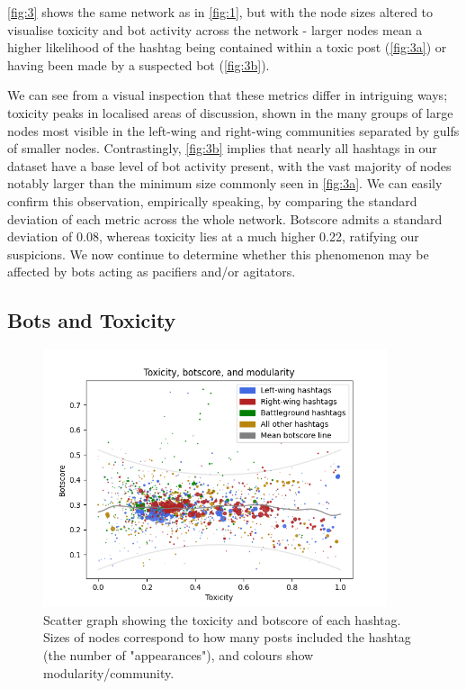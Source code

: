 \documentclass[a4paper,11pt]{article}  %
\begin{document}
	\autoref{fig:3} shows the same network as in \autoref{fig:1}, but with the node sizes altered to visualise toxicity and bot activity across the network - larger nodes mean a higher likelihood of the hashtag being contained within a toxic post (\autoref{fig:3a}) or having been made by a suspected bot (\autoref{fig:3b}). 
	
	We can see from a visual inspection that these metrics differ in intriguing ways; toxicity peaks in localised areas of discussion, shown in the many groups of large nodes most visible in the left-wing and right-wing communities separated by gulfs of smaller nodes. Contrastingly, \autoref{fig:3b} implies that nearly all hashtags in our dataset have a base level of bot activity present, with the vast majority of nodes notably larger than the minimum size commonly seen in \autoref{fig:3a}. We can easily confirm this observation, empirically speaking, by comparing the standard deviation of each metric across the whole network. Botscore admits a standard deviation of 0.08, whereas toxicity lies at a much higher 0.22, ratifying our suspicions. We now continue to determine whether this phenomenon may be affected by bots acting as pacifiers and/or agitators.
	
	\subsection{Bots and Toxicity}
	\label{subsec:bottox}
	
	\begin{figure}
		\begin{center}
			\includegraphics[width=0.9\textwidth]{images/plt_tox_bot_mod}
		\end{center}
		\caption{Scatter graph showing the toxicity and botscore of each hashtag. Sizes of nodes correspond to how many posts included the hashtag (the number of "appearances"), and colours show modularity/community.}
		\label{fig:4}
	\end{figure}
		
\end{document}
